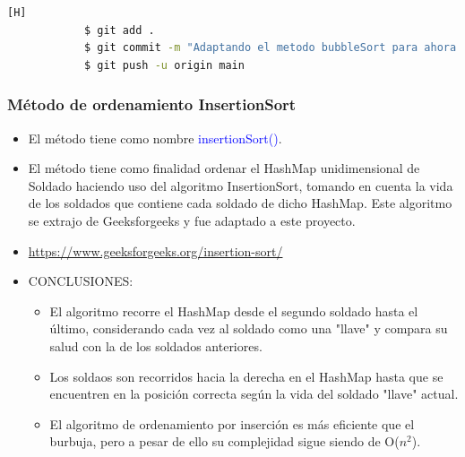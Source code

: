 \documentclass{article}
\begin{document}
        

        \begin{lstlisting}[language=bash,caption={Commit \href{https://github.com/hernanchoquehuanca/fp2-23b/commit/4310e7724c6d73de0a56027fbbc79df0cbc99e13}{4310e77}: Se agregó el método que contiene el algoritmo de ordenamiento bubbleSort, reutilizándola del laboratorio anterior y adaptándola a los nuevos ejércitos en HashMap}][H]
    		$ git add .
    		$ git commit -m "Adaptando el metodo bubbleSort para ahora trabajar con HashMap, cambiando el parametro del mismo y adaptando el metodo para colocar valores dentro del HashMap"
    		$ git push -u origin main
    	\end{lstlisting}
        
\newpage
        \subsubsection{Método de ordenamiento InsertionSort}
        
        \begin{itemize}
            \item El método tiene como nombre \textcolor{blue}{insertionSort()}.
            \item El método tiene como finalidad ordenar el HashMap unidimensional de Soldado haciendo uso del algoritmo InsertionSort, tomando en cuenta la vida de los soldados que contiene cada soldado de dicho HashMap. Este algoritmo se extrajo de Geeksforgeeks y fue adaptado a este proyecto.
            \item \href{https://www.geeksforgeeks.org/insertion-sort/}{https://www.geeksforgeeks.org/insertion-sort/}
            \item CONCLUSIONES:
            \begin{itemize}
                \item El algoritmo recorre el HashMap desde el segundo soldado hasta el último, considerando cada vez al soldado como una "llave" y compara su salud con la de los soldados anteriores.
                \item Los soldaos son recorridos hacia la derecha en el HashMap hasta que se encuentren en la posición correcta según la vida del soldado "llave" actual. 
                \item El algoritmo de ordenamiento por inserción es más eficiente que el burbuja, pero a pesar de ello su complejidad sigue siendo de O($n^2$).
            \end{itemize}
        \end{itemize}
        
\end{document}
